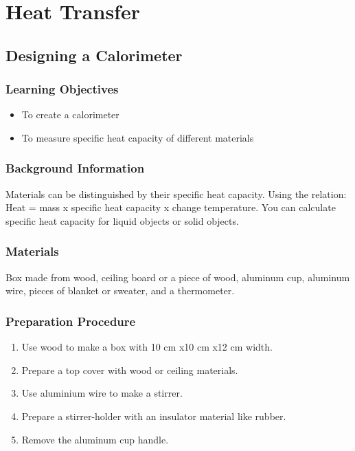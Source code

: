 \section{Heat Transfer}

\subsection{Designing a Calorimeter}

\subsubsection*{Learning Objectives}
\begin{itemize}
\item{To create a calorimeter}
\item{To measure specific heat capacity of different materials}
\end{itemize}

\subsubsection*{Background Information}
Materials can be distinguished by their specific heat capacity. Using the relation: Heat = mass x specific heat capacity x change temperature. You can calculate specific heat capacity for liquid objects or solid objects.

\subsubsection*{Materials}
Box made from wood, ceiling board or a piece of wood, aluminum cup, aluminum wire, pieces of blanket or sweater, and a thermometer.

\subsubsection*{Preparation Procedure}
\begin{enumerate}
\item{Use wood to make a box with 10 cm x10 cm x12 cm width.}
\item{Prepare a top cover with wood or ceiling materials.}
\item{Use aluminium wire to make a stirrer.}
\item{Prepare a stirrer-holder with an insulator material like rubber.}
\item{Remove the aluminum cup handle.}
\end{enumerate}

